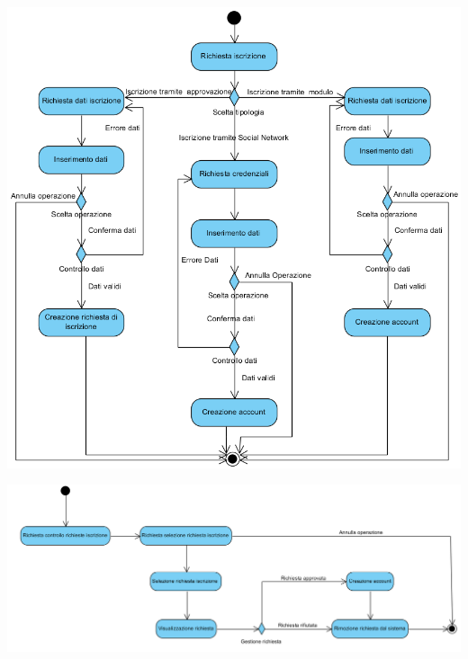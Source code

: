 \begin{center}
	\includegraphics[width=\textwidth]{assets/visualParadigm/attivita/iscrizioni}
\end{center}

\begin{landscape}
\begin{center}
	\includegraphics[width=\linewidth]{assets/visualParadigm/attivita/approvazioneIscrizione}
\end{center}
\end{landscape}

